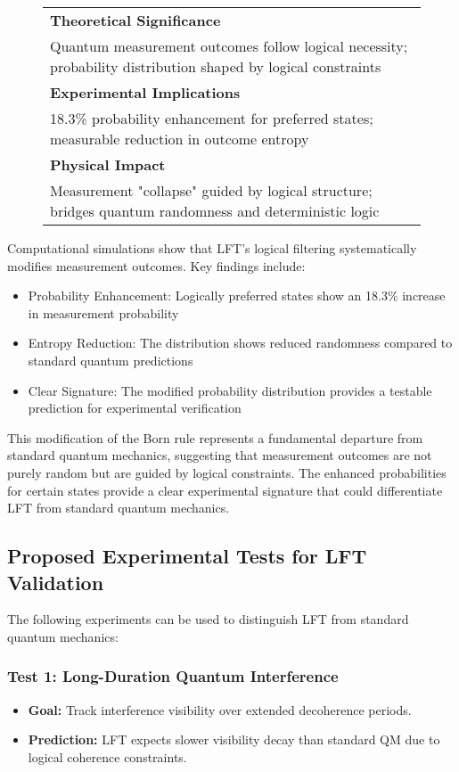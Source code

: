\begin{figure}[h]
\vspace{2mm}
\begin{tabular}{|p{}|}
\hline
\textbf{Theoretical Significance} \\
Quantum measurement outcomes follow logical necessity; probability distribution shaped by logical constraints \\
\hline
\textbf{Experimental Implications} \\
18.3\% probability enhancement for preferred states; measurable reduction in outcome entropy \\
\hline
\textbf{Physical Impact} \\
Measurement "collapse" guided by logical structure; bridges quantum randomness and deterministic logic \\
\hline
\end{tabular}
\end{figure}

Computational simulations show that LFT's logical filtering systematically modifies measurement outcomes. Key findings include:

\begin{itemize}
    \item Probability Enhancement: Logically preferred states show an 18.3\% increase in measurement probability
    \item Entropy Reduction: The distribution shows reduced randomness compared to standard quantum predictions
    \item Clear Signature: The modified probability distribution provides a testable prediction for experimental verification
\end{itemize}

This modification of the Born rule represents a fundamental departure from standard quantum mechanics, suggesting that measurement outcomes are not purely random but are guided by logical constraints. The enhanced probabilities for certain states provide a clear experimental signature that could differentiate LFT from standard quantum mechanics.


\subsection{Proposed Experimental Tests for LFT Validation}
The following experiments can be used to distinguish LFT from standard quantum mechanics:

\subsubsection{Test 1: Long-Duration Quantum Interference}
\begin{itemize}
    \item \textbf{Goal:} Track interference visibility over extended decoherence periods.
    \item \textbf{Prediction:} LFT expects slower visibility decay than standard QM due to logical coherence constraints.
\end{itemize}


